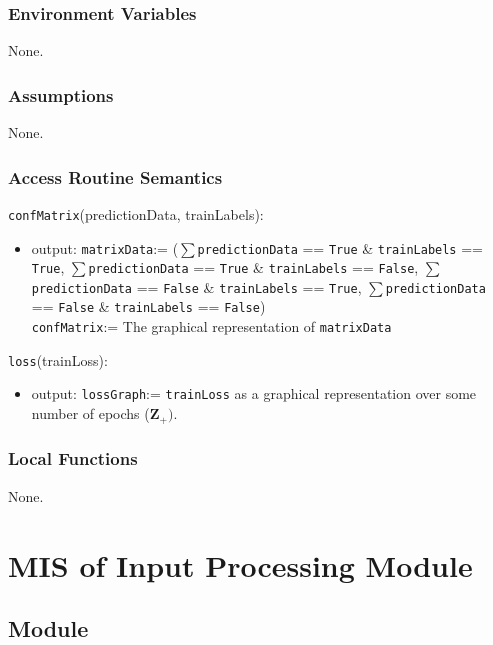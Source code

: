 \documentclass[12pt, titlepage]{article}
\def\code#1{\texttt{#1}}
\begin{document}
\subsubsection{Environment Variables}

None.

\subsubsection{Assumptions}

None.

\subsubsection{Access Routine Semantics}

\noindent \code{confMatrix}(predictionData, trainLabels):
\begin{itemize} 
\item output: \code{matrixData}:= ($\sum$\code{predictionData} == \code{True} \& \code{trainLabels} == \code{True}, $\sum$\code{predictionData} == \code{True} \& \code{trainLabels} == \code{False}, $\sum$\code{predictionData} == \code{False} \& \code{trainLabels} == \code{True}, $\sum$\code{predictionData} == \code{False} \& \code{trainLabels} == \code{False}) \\
\code{confMatrix}:= The graphical representation of \code{matrixData}

\end{itemize}

\noindent \code{loss}(trainLoss):
\begin{itemize} 
\item output: \code{lossGraph}:= \code{trainLoss} as a graphical representation over some number of epochs ($\mathbf{Z}_{+})$.
\end{itemize}

\subsubsection{Local Functions}

None.

\section{MIS of Input Processing Module} \label{ModuleIP} 

\subsection{Module}
\end{document}
